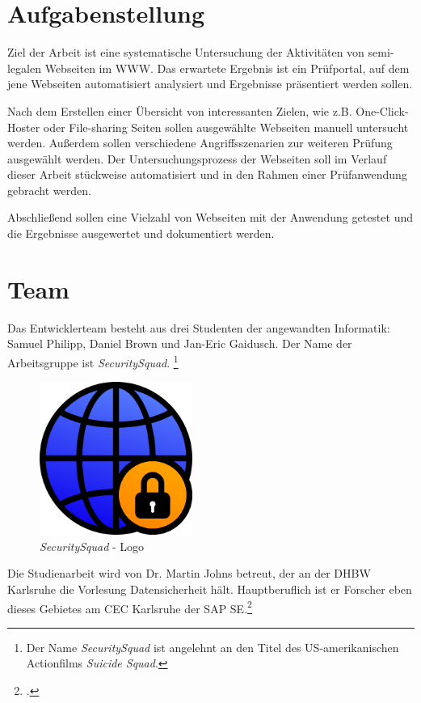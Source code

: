 \section{Aufgabenstellung}
Ziel der Arbeit ist eine systematische Untersuchung der Aktivitäten von semi-legalen Webseiten im
\ac{WWW}. Das erwartete Ergebnis ist ein Prüfportal, auf dem jene Webseiten automatisiert
analysiert und Ergebnisse präsentiert werden sollen.

Nach dem Erstellen einer Übersicht von interessanten Zielen, wie z.B. One-Click-Hoster oder
File-sharing Seiten sollen ausgewählte Webseiten manuell untersucht werden. Außerdem sollen
verschiedene Angriffsszenarien zur weiteren Prüfung ausgewählt werden. Der Untersuchungsprozess der
Webseiten soll im Verlauf dieser Arbeit stückweise automatisiert und in den Rahmen einer
Prüfanwendung gebracht werden.

Abschließend sollen eine Vielzahl von Webseiten mit der Anwendung getestet und die Ergebnisse
ausgewertet und dokumentiert werden.

\section{Team}
Das Entwicklerteam besteht aus drei Studenten der angewandten Informatik:
Samuel Philipp, Daniel Brown und Jan-Eric Gaidusch.
Der Name der Arbeitsgruppe ist \textit{SecuritySquad}.
\footnote{Der Name \textit{SecuritySquad} ist angelehnt an den Titel des US-amerikanischen Actionfilms \textit{Suicide Squad}.}

\begin{figure}[H]
	\centering
	\includegraphics[width=5cm]{images/securitysquad}
	\caption{\textit{SecuritySquad} - Logo}
	\label{fig:securitysquad-logo}
\end{figure}

Die Studienarbeit wird von Dr. Martin Johns betreut, der an der DHBW Karlsruhe die Vorlesung Datensicherheit hält. Hauptberuflich ist er Forscher eben dieses Gebietes am CEC Karlsruhe der SAP SE.\footcite[Vgl.][]{johnsProfile}

